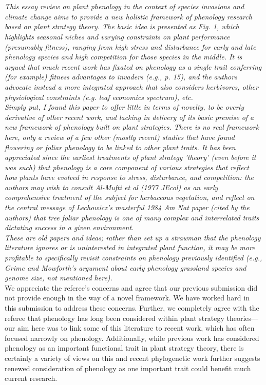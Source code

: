 \documentclass[11pt,a4paper]{letter}
\begin{document}
\begin{letter}{}
\\
\\
\emph{This essay review on plant phenology in the context of species invasions and climate change aims to provide a new holistic framework of phenology research based on plant strategy theory. The basic idea is presented as Fig. 1, which highlights seasonal niches and varying constraints on plant performance (presumably fitness), ranging from high stress and disturbance for early and late phenology species and high competition for those species in the middle. It is argued that much recent work has fixated on phenology as a single trait conferring (for example) fitness advantages to invaders (e.g., p. 15), and the authors advocate instead a more integrated approach that also considers herbivores, other physiological constraints (e.g. leaf economics spectrum), etc. \\ Simply put, I found this paper to offer little in terms of novelty, to be overly derivative of other recent work, and lacking in delivery of its basic premise of a new framework of phenology built on plant strategies. There is no real framework here, only a review of a few other (mostly recent) studies that have found flowering or foliar phenology to be linked to other plant traits. It has been appreciated since the earliest treatments of plant strategy 'theory' (even before it was such) that phenology is a core component of various strategies that reflect how plants have evolved in response to stress, disturbance, and competition: the authors may wish to consult Al-Mufti et al (1977 JEcol) as an early comprehensive treatment of the subject for herbaceous vegetation, and reflect on the central message of Lechowicz's masterful 1984 Am Nat paper (cited by the authors) that tree foliar phenology is one of many complex and interrelated traits dictating success in a given environment.\\
These are old papers and ideas; rather than set up a strawman that the phenology literature ignores or is uninterested in integrated plant function, it may be more profitable to specifically revisit constraints on phenology previously identified (e.g., Grime and Mowforth's argument about early phenology grassland species and genome size, not mentioned here). }\\ 

We appreciate the referee's concerns and agree that our previous submission did not provide enough in the way of a novel framework. We have worked hard in this submission to address these concerns. Further, we completely agree with the referee that phenology has long been considered within plant strategy theories---our aim here was to link some of this literature to recent work, which has often focused narrowly on phenology. Additionally, while previous work has considered phenology as an important functional trait in plant strategy theory, there is certainly a variety of views on this \citep[e.g.,][]{Ollerton:1992kf} and recent phylogenetic work further suggests renewed consideration of phenology as one important trait could benefit much current research.


\end{letter}
\end{document}
